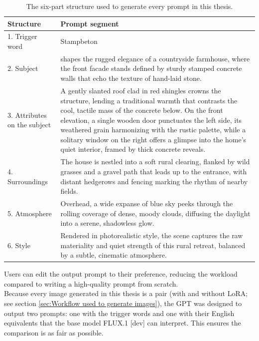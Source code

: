 \begin{table}[H]
  \centering
  \begin{tabular}{l p{}}
    \toprule
    Structure & Prompt segment \\
    \midrule
    1. Trigger word 
    & Stampbeton \\
    2. Subject
    & shapes the rugged elegance of a countryside farmhouse, where the front facade stands defined by sturdy stamped concrete walls that echo the texture of hand-laid stone. \\
    3. Attributes on the subject
    & A gently slanted roof clad in red shingles crowns the structure, lending a traditional warmth that contrasts the cool, tactile mass of the concrete below. On the front elevation, a single wooden door punctuates the left side, its weathered grain harmonizing with the rustic palette, while a solitary window on the right offers a glimpse into the home’s quiet interior, framed by thick concrete reveals. \\
    4. Surroundings
    & The house is nestled into a soft rural clearing, flanked by wild grasses and a gravel path that leads up to the entrance, with distant hedgerows and fencing marking the rhythm of nearby fields. \\
    5. Atmosphere 
    & Overhead, a wide expanse of blue sky peeks through the rolling coverage of dense, moody clouds, diffusing the daylight into a serene, shadowless glow. \\
    6. Style 
    & Rendered in photorealistic style, the scene captures the raw materiality and quiet strength of this rural retreat, balanced by a subtle, cinematic atmosphere. \\
    \bottomrule
  \end{tabular}
  \caption{The six-part structure used to generate every prompt in this thesis.\\}
  \label{tab:gptprompt}
\end{table}
Users can edit the output prompt to their preference, reducing the workload compared to writing a high-quality prompt from scratch. \\
Because every image generated in this thesis is a pair (with and without LoRA; see section \ref{sec:Workflow used to generate images}), the GPT was designed to output two prompts: one with the trigger words and one with their English equivalents that the base model FLUX.1 [dev] can interpret. This ensures the comparison is as fair as possible.


